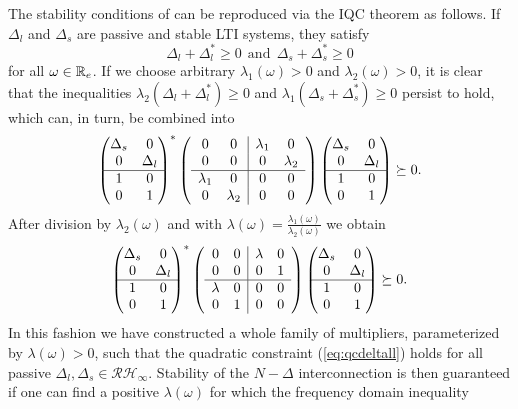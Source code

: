 The stability conditions of  can be reproduced via the IQC theorem as 
follows. If $\Delta_l$ and $\Delta_s$ are passive and stable LTI systems, they satisfy
\[
\Delta_l + \Delta_l^* \geq 0 \ \ \text{and}\ \
\Delta_s + \Delta_s^* \geq 0
\]
for all $\omega\in\mathbb{R}_e$. If we choose arbitrary $\lambda_1(\omega)>0$ and $\lambda_2(\omega)>0$, it is clear that
the inequalities
$\lambda_2(\Delta_l + \Delta_l^*) \geq 0$ and $\lambda_1(\Delta_s + \Delta_s^*) \geq 0$
persist to hold, which can, in turn, be combined into
\[%
\pmatr{\Delta_s &0\\0 &\Delta_l\\\hline 1 &0\\0 &1}^*\left(\begin{array}{cc|cc}
      0&0  &\lambda_1 &0 \\
      0&0  &0         &\lambda_2\\ \hline
      \lambda_1 &0 &0 &0\\
      0 &\lambda_2 &0 &0
\end{array}\right)
\pmatr{\Delta_s &0\\0 &\Delta_l\\\hline 1 &0\\0 &1}
\succeq 0.
\]
After division by $\lambda_2(\omega)$ and with
$\lambda(\omega)=\frac{\lambda_1(\omega)}{\lambda_2(\omega)}$ we
obtain
\begin{equation}
\begin{pmatrix}\Delta_s &0\\0 &\Delta_l\\\hline 1 &0\\0 &1\end{pmatrix}^*\left(\begin{array}{cc|cc}
      0&0  &\lambda &0 \\
      0&0  &0         &1\\ \hline
      \lambda &0 &0 &0\\
      0 &1 &0 &0
\end{array}\right)
\begin{pmatrix}\Delta_s &0\\0 &\Delta_l\\\hline 1 &0\\0 &1\end{pmatrix} \succeq 0.
\label{eq:qcdeltall}
\end{equation}
In this fashion we have constructed a whole family of multipliers, parameterized by $\lambda(\omega)>0$, such that the quadratic constraint (\ref{eq:qcdeltall}) holds for all passive $\Delta_l,\Delta_s\in\mathcal{RH}_\infty$. Stability of the $N-\Delta$ interconnection is then guaranteed if one can find a positive $\lambda(\omega)$ for which the frequency domain inequality
